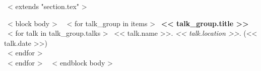 ~< extends "section.tex" >~

~< block body >~
  ~< for talk_group in items >~
    \textbf{<< talk_group.title >>} \\
    ~< for talk in talk_group.talks >~
      \hspace{0.2in} << talk.name >>. \textit{<< talk.location >>}. (<< talk.date >>) \\
    ~< endfor >~
    \\
  ~< endfor >~
\vspace{-.15in}
~< endblock body >~
